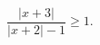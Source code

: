 \begin{ex}[type=inequality]
	\begin{condition}
		$ \dfrac{|x + 3|}{|x + 2| - 1}\geqslant1.$
	\end{condition}
\end{ex}
